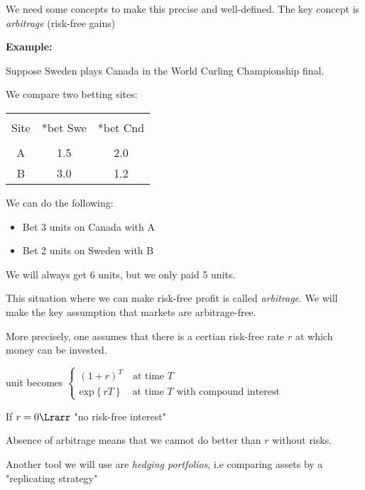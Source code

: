 \par\bigskip
\noindent We need some concepts to make this precise and well-defined. The key concept is \textit{arbitrage} (risk-free gains)
\par\bigskip
\noindent\textbf{Example:}\par
\noindent Suppose Sweden plays Canada in the World Curling Championship final.\par
\noindent We compare two betting sites:\par
\begin{center}
  \begin{tabular}{|c|c|c|}
    \hline\\
    Site&*bet Swe&*bet Cnd\\
    \hline\\
    A&1.5&2.0\\
    B&3.0&1.2\\
    \hline
  \end{tabular}
\end{center}\par
\noindent We can do the following:\par
\begin{itemize}
  \item Bet 3 units on Canada with A
  \item Bet 2 units on Sweden with B
\end{itemize}\par
\noindent We will always get 6 units, but we only paid 5 units.\par
\noindent This situation where we can make risk-free profit is called \textit{arbitrage}. We will make the key assumption that markets are arbitrage-free.\par
\noindent More precisely, one assumes that there is a certian risk-free rate $r$ at which money can be invested.\par
{} unit becomes $\begin{cases}
  (1+r)^T\quad\text{at time }T\\\text{exp}\left\{rT\right\}\quad\text{at time $T$ with compound interest}
\end{cases}$\par
\noindent If $r=0\Lrarr$ "no risk-free interest"
\par\bigskip
\noindent Absence of arbitrage means that we cannot do better than $r$ without risks.
\par\bigskip
\noindent Another tool we will use are \textit{hedging portfolios}, i.e comparing assets by a "replicating strategy"

